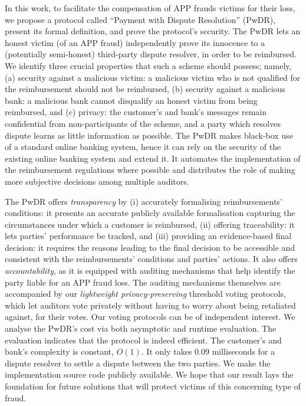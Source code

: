  In this work, to facilitate the compensation of   APP frauds victims for their loss, we propose a protocol called ``Payment with Dispute Resolution'' (PwDR), present its formal definition,  and prove the protocol's security.  The PwDR lets an honest victim (of an APP fraud)  independently prove its innocence to a  (potentially semi-honest) third-party dispute resolver, in order to be reimbursed.  We identify three crucial properties that such a scheme should possess; namely, (a) security against a malicious victim: a malicious victim who is not qualified for the reimbursement should not be reimbursed, (b) security against a malicious bank: a malicious bank cannot disqualify an honest victim from being reimbursed, and (c) privacy: the customer’s and bank’s messages remain confidential from non-participants of the scheme, and a party which resolves dispute learns as little information as possible.  The PwDR makes black-box use of a standard online banking system, hence it can rely on the security of the existing online banking system and extend it. %
%
   It automates the implementation of the reimbursement regulations where possible and distributes the role of making more subjective decisions among multiple auditors.


  The PwDR offers \emph{transparency} by (i) accurately formalising reimbursements' conditions: it presents an accurate publicly available formalisation capturing the circumstances under which a customer is reimbursed,  (ii) offering traceability:  it lets parties'  performance be tracked, and (iii) providing an evidence-based final decision: it requires the reasons leading to the final decision to be accessible and consistent with the reimbursements' conditions and parties' actions.  It also offers \emph{accountability}, as it is equipped with auditing mechanisms that help identify the party liable for an APP fraud loss.  The auditing mechanisms themselves are accompanied by our \emph{lightweight privacy-preserving} threshold voting protocols, which let auditors vote privately without having to worry about being retaliated against,  for their votes. Our voting protocols can be of independent interest.   We analyse the PwDR's cost via both asymptotic and runtime evaluation. The evaluation indicates that the protocol is indeed efficient. The customer's and bank's complexity is constant, $O(1)$. It only takes $0.09$ milliseconds for a dispute resolver to settle a dispute between the two parties. We make the implementation source code publicly available. We hope that our result lays the foundation for future solutions that will protect victims of this concerning type of fraud. 

